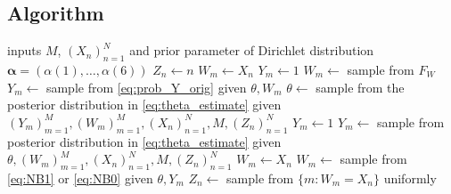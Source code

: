 \documentclass[12pt]{article}
\begin{document}
\subsection{Algorithm}
\begin{algorithmic}[1]
\REQUIRE inputs $M$, $(X_n)_{n=1}^N$ and prior parameter of Dirichlet distribution $\boldsymbol \alpha= \left(\alpha(1),\ldots,\alpha(6)\right)$
\STATE $Z_n \leftarrow n$ 
\ENDFOR
{} 
\STATE $W_m \leftarrow X_n$
\STATE $Y_m \leftarrow 1$
\ELSE
\STATE $W_m \leftarrow$ sample from $F_W$
\STATE $Y_m \leftarrow$ sample from \eqref{eq:prob_Y_orig} given $\theta, W_m$
\ENDIF
\ENDFOR
\LOOP
\STATE $\theta \leftarrow$ sample from the posterior distribution in \eqref{eq:theta_estimate} given $ (Y_m)_{m=1}^M, (W_m)_{m=1}^M, (X_n)_{n=1}^N, M, (Z_n)_{n=1}^N$ 
\STATE $Y_m \leftarrow 1$
\ELSE
\STATE $Y_m \leftarrow$ sample from posterior distribution in \eqref{eq:theta_estimate} given $\theta, (W_m)_{m=1}^M, (X_n)_{n=1}^N, M, (Z_n)_{n=1}^N$ 
\ENDIF
\ENDFOR
{}
\STATE $W_m \leftarrow X_n$
\ELSE
\STATE $W_m \leftarrow$ sample from \eqref{eq:NB1} or \eqref{eq:NB0} given $\theta, Y_m$ 
\ENDIF
\ENDFOR
{}
\STATE $Z_n \leftarrow$ sample from $\{m:W_m=X_n\}$ uniformly
\ENDFOR
\ENDLOOP

%
\end{algorithmic}
\end{document}
